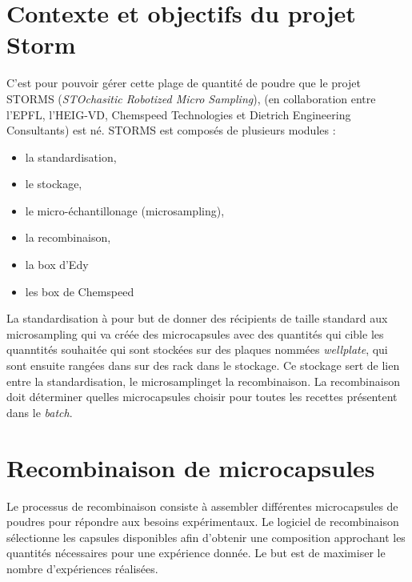 \section{Contexte et objectifs du projet Storm}
C'est pour pouvoir gérer cette plage de quantité de poudre que le projet STORMS (\textit{STOchasitic Robotized Micro Sampling}), (en collaboration entre l'EPFL, l'HEIG-VD, Chemspeed Technologies et Dietrich Engineering Consultants) est né. STORMS est composés de plusieurs modules :
\begin{itemize}
    \item la standardisation,
    \item le stockage,
    \item le micro-échantillonage (\og microsampling\fg),
    \item la recombinaison,
    \item la box d'Edy
    \item les box de Chemspeed
\end{itemize}
La standardisation à pour but de donner des récipients de taille standard aux microsampling qui va créée des microcapsules avec des quantités qui cible les quanntités souhaitée qui sont stockées sur des plaques nommées \og \textit{wellplate}\fg, qui sont ensuite rangées dans sur des rack dans le stockage. Ce stockage sert de lien entre la standardisation, le \og microsampling\fg  et la recombinaison.
La recombinaison doit déterminer quelles microcapsules choisir pour toutes les recettes présentent dans le \og \textit{batch}\fg.

\section{Recombinaison de microcapsules}
Le processus de recombinaison consiste à assembler différentes microcapsules de poudres pour répondre aux besoins expérimentaux. Le logiciel de recombinaison sélectionne les capsules
disponibles afin d'obtenir une composition approchant les quantités nécessaires pour une expérience donnée. Le but est de maximiser le nombre d'expériences réalisées.